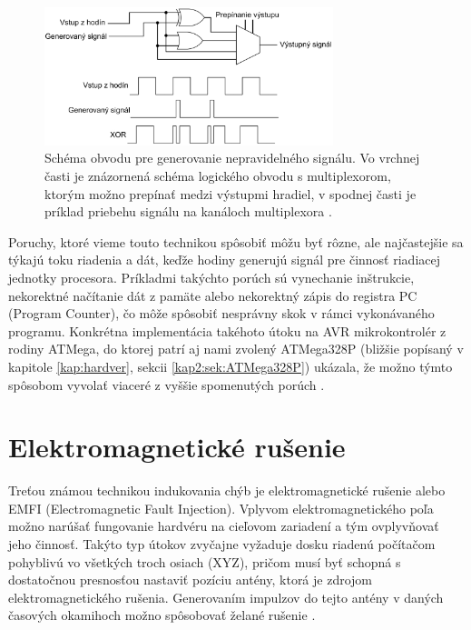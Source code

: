 \begin{figure}
    \centerline{\includegraphics[width=0.75\textwidth]{images/clock.png}}
    \caption[Schéma obvodu pre generovanie nepravidelného signálu]{Schéma obvodu pre generovanie nepravidelného signálu. Vo vrchnej časti je znázornená schéma logického obvodu s multiplexorom, ktorým možno prepínať medzi výstupmi hradiel, v spodnej časti je príklad priebehu signálu na kanáloch multiplexora \cite{clockCircuit}.}
    \label{obr:clock}
\end{figure}

Poruchy, ktoré vieme touto technikou spôsobiť môžu byť rôzne, ale najčastejšie sa týkajú toku riadenia a dát, keďže hodiny generujú signál pre činnosť riadiacej jednotky procesora. Príkladmi takýchto porúch sú vynechanie inštrukcie, nekorektné načítanie dát z pamäte alebo nekorektný zápis do registra PC (Program Counter), čo môže spôsobiť nesprávny skok v rámci vykonávaného programu. Konkrétna implementácia takéhoto útoku na AVR mikrokontrolér z rodiny ATMega, do ktorej patrí aj nami zvolený ATMega328P (bližšie popísaný v kapitole \ref{kap:hardver}, sekcii \ref{kap2:sek:ATMega328P}) ukázala, že možno týmto spôsobom vyvolať viaceré z vyššie spomenutých porúch \cite{clock}.

\section{Elektromagnetické rušenie} \label{kap1:sek:elektromagnetickeRusenie}
Treťou známou technikou indukovania chýb je elektromagnetické rušenie alebo EMFI (Electromagnetic Fault Injection). Vplyvom elektromagnetického poľa možno narúšať fungovanie hardvéru na cieľovom zariadení a tým ovplyvňovať jeho činnosť. Takýto typ útokov zvyčajne vyžaduje dosku riadenú počítačom pohyblivú vo všetkých troch osiach (XYZ), pričom musí byť schopná s dostatočnou presnosťou nastaviť pozíciu antény, ktorá je zdrojom elektromagnetického rušenia. Generovaním impulzov do tejto antény v daných časových okamihoch možno spôsobovať želané rušenie \cite{emfi}.

